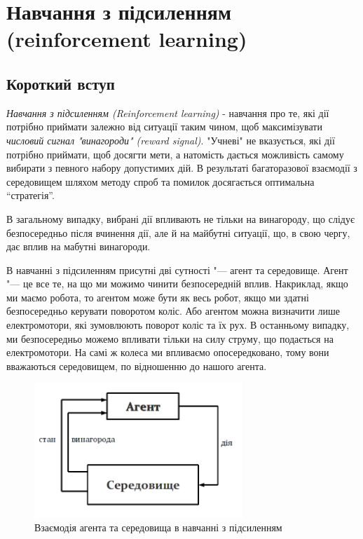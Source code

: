 \newpage
\section{Навчання з підсиленням (reinforcement learning)}

\subsection{Короткий вступ}

\emph{Навчання з підсиленням (Reinforcement learning)} - навчання про те, які дії потрібно приймати залежно від ситуації таким чином, щоб максимізувати \emph{числовий сигнал "винагороди" (reward signal)}. "Учневі" не вказується, які дії потрібно приймати, щоб досягти мети, а натомість дається можливість самому вибирати  з певного набору допустимих дій. В результаті багаторазової взаємодії з середовищем шляхом методу спроб та помилок досягається оптимальна ``стратегія''.

В загальному випадку, вибрані дії впливають не тільки на винагороду, що слідує безпосередньо після вчинення дії, але й на майбутні ситуації, що, в свою чергу, дає вплив на мабутні винагороди.

В навчанні з підсиленням присутні дві сутності "--- агент та середовище. Агент "--- це все те, на що ми можимо чинити безпосередній вплив.
Накриклад, якщо ми маємо робота, то агентом може бути як весь робот, якщо ми здатні безпосередньо керувати поворотом коліс. Або агентом можна визначити лише електромотори, які зумовлюють поворот коліс та їх рух. В останньому випадку, ми безпосередньо можемо впливати тільки на силу струму, що подається на електромотори. На самі ж колеса ми впливаємо опосередковано, тому вони вважаються середовищем, по відношенню до нашого агента.

\begin{figure}[!h]\begin{center}
\includegraphics[width=0.7\textwidth]{agent_env_diagram.png}
\caption{Взаємодія агента та середовища в навчанні з підсиленням}
\end{center}\end{figure}

